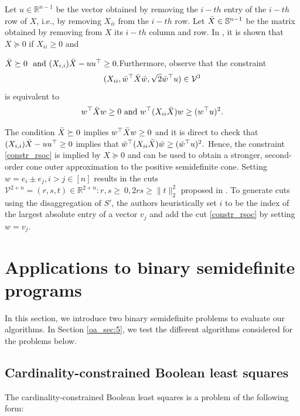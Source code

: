 \documentclass{article}
\begin{document}
Let $u \in \mathbb{R}^{n-1}$ be the vector obtained by removing the $i-th$ entry of the $i-th$ row of $X$, i.e., by removing $X_{ii}$ from the $i-th$ row. Let $\Bar{X}\in \mathbb{S}^{n-1}$ be the matrix obtained by removing from $X$ its $i-th$ column and row. In \cite{kim2003second}, it is shown that $X\succeq 0$ if $X_{ii} \geq 0 $ and

$
\Bar{X} \succeq 0 \ \text{ and } (X_{i,i}) \Bar{X} - uu^\top \geq 0.
$Furthermore,  observe that the constraint
\begin{equation}\label{constr_rsoc}
(X_{ii}, \Bar{w}^\top \Bar{X}  \Bar{w}, \sqrt{2} \Bar{w}^\top u ) \in \mathcal{V}^3
\end{equation}
is equivalent to 
\begin{equation}
w^\top  \Bar{X} w \geq 0 \text{ and } w^\top (X_{ii} \Bar{X}) w \geq (w^\top u)^2.
\end{equation}

The condition $ \Bar{X} \succeq 0 $ implies $w^\top  \Bar{X} w \geq 0$ and it is direct to check that 
$(X_{i,i}) \Bar{X} - uu^\top \geq 0$ implies that 
$ \Bar{w}^\top (X_{ii} \Bar{X})  \Bar{w} \geq ( \Bar{w}^\top u)^2.$
Hence, the constraint \eqref{constr_rsoc} is implied by $X \succeq 0$ and can be used to obtain a stronger, second-order cone outer approximation to the positive semidefinite cone.  Setting $w = e_i\pm e_j, i>j \in [n]$ results in the cuts 
$\mathcal{V}^{2+n} = (r,s,t) \in \mathbb{R}^{2+n}: r,s\geq \ 0, 2rs \geq \|t\|_2^2 $ proposed in \citet{coey2020outer}. To generate cuts using the disaggregation of $S'$, the authors heuristically set $i$ to be the index of the largest absolute entry of a vector $v_j$ and add the cut \eqref{constr_rsoc} by setting $w=v_j$. 


\section{Applications to binary semidefinite programs}
\label{oa_sec:4}

In this section, we introduce two binary semidefinite problems to evaluate our algorithms. In Section \ref{oa_sec:5}, we test the different algorithms considered for the problems below.


\subsection{Cardinality-constrained Boolean least squares}


The cardinality-constrained Boolean least squares is a problem of the following form:
\end{document}
